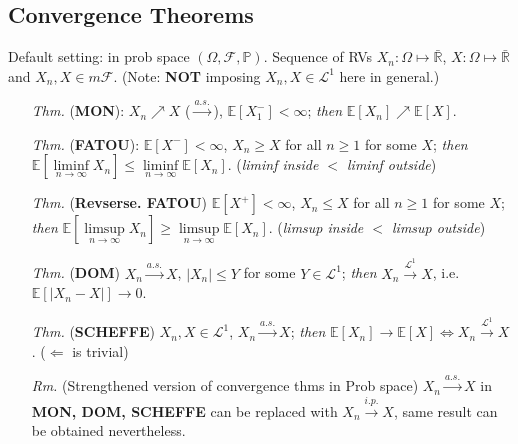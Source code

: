 \documentclass[a4paper,12pt,twoside]{book}
\begin{document}
\subsection{Convergence Theorems}
Default setting: in prob space $(\Omega, \mathcal{F}, \mathbb{P})$. Sequence of RVs $X_n: \Omega \mapsto \bar{\mathbb{R}}$, $X: \Omega \mapsto \bar{\mathbb{R}}$ and $X_n, X\in m \mathcal{F}$. (Note: \textbf{NOT} imposing $X_n,X\in \mathcal{L}^1$ here in general.)
\begin{itemize}
	\item[\textit{Thm.}] (\textbf{MON}): $X_n \nearrow X$ ($\xrightarrow{a.s.}$), $\mathbb{E}[X_1^-]<\infty$; \textit{then} $\mathbb{E}[X_n]\nearrow \mathbb{E}[X]$.

	\item[\textit{Thm.}] (\textbf{FATOU}): $\mathbb{E}[X^-]<\infty$, $X_n\geq X$ for all $n\geq1$ for some $X$; \textit{then} $\mathbb{E}[\liminf\limits_{n\rightarrow\infty}X_n]\leq \liminf\limits_{n\rightarrow\infty}\mathbb{E}[X_n]$. (\textit{liminf inside $<$ liminf outside})

	\item[\textit{Thm.}] (\textbf{Revserse. FATOU}) $\mathbb{E}[X^+]<\infty$, $X_n\leq X$ for all $n\geq1$ for some $X$; \textit{then} $\mathbb{E}[\limsup\limits_{n\rightarrow\infty}X_n]\geq \limsup\limits_{n\rightarrow\infty}\mathbb{E}[X_n]$. (\textit{limsup inside $<$ limsup outside})

	\item[\textit{Thm.}] (\textbf{DOM}) $X_n \xrightarrow{a.s.} X$, $|X_n|\leq Y$ for some $Y\in \mathcal{L}^1$; \textit{then} $X_n \xrightarrow{\mathcal{L}^1} X$, i.e. $\mathbb{E}[|X_n-X|]\to 0$.

	\item[\textit{Thm.}] (\textbf{SCHEFFE}) $X_n, X\in \mathcal{L}^1$, $X_n\xrightarrow{a.s.} X$; \textit{then} $\mathbb{E}\left[X_n\right]\to \mathbb{E}\left[X\right] \iff X_n \xrightarrow{\mathcal{L}^1} X$. ($\Leftarrow$ is trivial)

	\item[\textit{Rm.}] (Strengthened version of convergence thms in Prob space) $X_n \xrightarrow{a.s.} X$ in \textbf{MON, DOM, SCHEFFE} can be replaced with $X_n \xrightarrow{i.p.} X$, same result can be obtained nevertheless.

\end{itemize}

\end{document}
